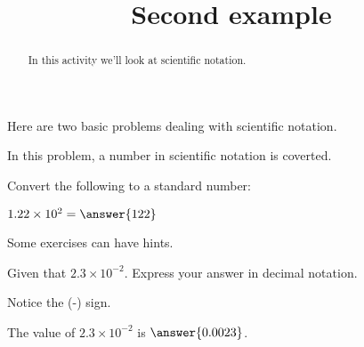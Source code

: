 \documentclass{ximera}
\title{Second example}
\begin{document}
\begin{abstract}
In this activity we'll look at scientific notation.
\end{abstract}
\maketitle




Here are two basic problems dealing with scientific notation. 

\begin{example}
In this problem, a number in scientific notation is coverted.
\end{example}


Convert the following to a standard number:

\begin{exercise}
$1.22\times 10^2=\answer{122}$
\end{exercise}

Some exercises can have hints.

\begin{exercise}
Given that $2.3\times 10^{-2}$. Express your answer in decimal notation.
%
\begin{hint}
Notice the (-) sign.
\end{hint}


The value of $2.3\times 10^{-2}$ is $\answer{0.0023}$.
%
\end{exercise}
\end{document}
